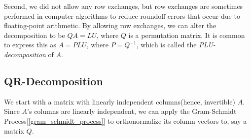 \documentclass{report}
\begin{document}
			Second, we did not allow any row exchanges, but row exchanges are sometimes performed in computer algorithms to reduce roundoff errors that occur due to floating-point arithmetic. By allowing row exchanges, we can alter the decomposition to be $QA=LU$, where $Q$ is a permutation matrix. It is common to express this as $A=PLU$, where $P=Q^{-1}$, which is called the \emph{PLU-decomposition} of $A$.
		
		\subsection{QR-Decomposition}
			We start with a matrix with linearly independent columns(hence, invertible) $A$. Since $A$'s columns are linearly independent, we can apply the Gram-Schmidt Process[\ref{gram_schmidt_process}] to orthonormalize its column vectors to, say a matrix $Q$.
			
\end{document}
